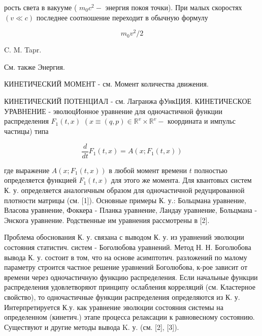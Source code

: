 \documentclass[10pt]{article}
\begin{document}
рость света в вакууме ( $m_{0} c^{2}-$ энергия покоя точки). При малых скоростях $(v \ll c)$ последнее соотношение переходит в обычную формулу



\[

m_{0} v^{2} / 2

\]



C. M. Tapr.



См. также Энергия.



КИНЕТИЧЕСКИЙ МОМЕНТ - см. Момент количества движения.



КИНЕТИЧЕСКИЙ ПОТЕНЦИАЛ - см. Лагранжа фУнкЦИЯ. КИНЕТИЧЕСКОЕ УРАВНЕНИЕ - эволюцИонное уравнение для одночастичной функции распределения $F_{1}(t, x)$ $\left(x \equiv(q, p) \in \mathbb{R}^{v} \times \mathbb{R}^{v}-\right.$ координата и импульс частицы) типа



\[

\frac{d}{d t} F_{1}(t, x)=A\left(x ; F_{1}(t, x)\right)

\]



где выражение $A\left(x ; F_{1}(t, x)\right)$ в любой момент времени $t$ полностью определяется функцией $F_{1}(t, x)$ для этого же момента. Для квантовых систем К. у. определяется аналогичным образом для одночастичной редуцированной плотности матрицы (см. [1]). Основные примеры К. у.: Больцмана уравнение, Власова уравнение, Фоккера - Планка уравнение, Ландау уравнение, Больцмана - Энскога уравнение. Родственные им уравнения рассмотрены в [2].



Проблема обоснования К. у. связана с выводом К. у. из уравнений эволюции состояния статистич. систем - Боголюбова уравнений. Метод Н. Н. Боголюбова вывода К. у. состоит в том, что на основе асимптотич. разложений по малому параметру строится частное решение уравнений Боголюбова, к-рое зависит от времени через одночастичную функцию распределения. Если начальные функции распределения удовлетворяют принципу ослабления корреляций (см. Кластерное свойство), то одночастичные функции распределения определяются из К. у. Интерпретируется К.у. как уравнение эволюции состояния системы на определенном (кинетич.) этапе процесса релаксации к равновесному состоянию. Существуют и другие методы вывода K. у. (см. [2], [3]).
\end{document}
